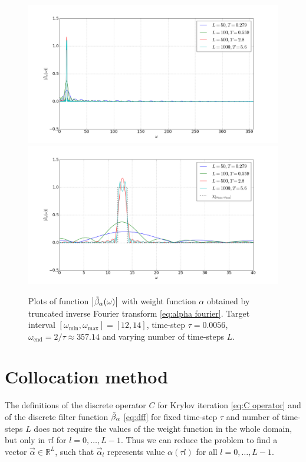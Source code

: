 \documentclass[a4paper,11pt,bibliography=totoc,listof=totoc,headinclude=true,cleardoublepage=empty,oneside]{scrbook}
\newcommand{\R}{\mathbb{R}}
\newcommand{\dff}{\Tilde{\beta}_\alpha}
\newcommand{\e}{\mathrm{end}}
\begin{document}
\begin{figure}
    \centering
    \includegraphics[width=1\linewidth]{latex//images//fourier/Figure_4.png}
    \includegraphics[width=1\linewidth]{latex//images//fourier/Figure_5.png}
    \caption{Plots of function $\left|\dff(\omega) \right|$ with weight function $\alpha$ obtained by truncated inverse Fourier transform \eqref{eq:alpha fourier}. Target interval $\left[\omega_{\min}, \omega_{\max} \right] = [12, 14]$, time-step $\tau = 0.0056$, $\omega_\e = 2/\tau \approx 357.14$ and varying number of time-steps $L$. }
    \label{fig:fourier2}
\end{figure}

\section{Collocation method}\label{section:collocation}
The definitions of the discrete operator $C$ for Krylov iteration \eqref{eq:C operator} and of the discrete filter function $\dff$ \eqref{eq:dff} for fixed time-step $\tau$ and number of time-steps $L$ does not require the values of the weight function in the whole domain, but only in $\tau l$ for $l=0, \dots, L-1$. Thus we can reduce the problem to find a vector $\Vec{\alpha} \in \R^L$, such that $\Vec{\alpha}_l$ represents value $\alpha(\tau l)$ for all $l=0, \dots, L-1$.
\end{document}
